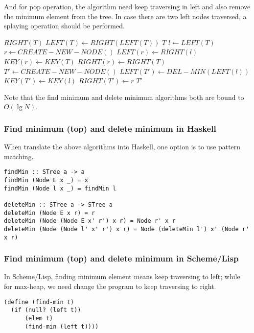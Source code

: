 \documentclass{article}
\begin{document}
And for pop operation, the algorithm need keep traversing in left
and also remove the minimum element from the tree. In case there
are two left nodes traversed, a splaying operation should be performed.

\begin{algorithmic}[1]
    \State \Return $RIGHT(T)$
    \State $LEFT(T) \gets RIGHT(LEFT(T))$
    \State \Return $T$
  \Else
    \State $l \gets LEFT(T)$
    \State $r \gets CREATE-NEW-NODE()$
    \State $LEFT(r) \gets RIGHT(l)$
    \State $KEY(r) \gets KEY(T)$
    \State $RIGHT(r) \gets RIGHT(T)$
    \State $T' \gets CREATE-NEW-NODE()$
    \State $LEFT(T') \gets DEL-MIN(LEFT(l))$
    \State $KEY(T') \gets KEY(l)$
    \State $RIGHT(T') \gets r$
    \State \Return $T'$
  \EndIf
\EndFunction
\end{algorithmic}

Note that the find minimum and delete minimum algorithms both are
bound to $O(\lg N)$.

\subsubsection*{Find minimum (top) and delete minimum in Haskell}

When translate the above algorithms into Haskell, one option is to
use pattern matching.

\lstset{language=Haskell}
\begin{lstlisting}
findMin :: STree a -> a
findMin (Node E x _) = x
findMin (Node l x _) = findMin l

deleteMin :: STree a -> STree a
deleteMin (Node E x r) = r
deleteMin (Node (Node E x' r') x r) = Node r' x r
deleteMin (Node (Node l' x' r') x r) = Node (deleteMin l') x' (Node r' x r)
\end{lstlisting}

\subsubsection*{Find minimum (top) and delete minimum in Scheme/Lisp}

In Scheme/Lisp, finding minimum element means keep traversing to left;
while for max-heap, we need change the program to keep traversing to
right.

\lstset{language=lisp}
\begin{lstlisting}
(define (find-min t)
  (if (null? (left t)) 
      (elem t)
      (find-min (left t))))
\end{lstlisting}
\end{document}

